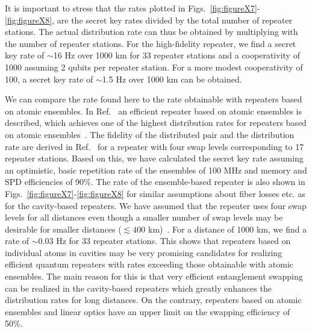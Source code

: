 It is important to stress that the rates plotted in
Figs.~\ref{fig:figureX7}-\ref{fig:figureX8}, are the secret key rates divided by
the total number of repeater stations. The actual distribution rate can thus be
obtained by multiplying with the number of repeater stations. For the
high-fidelity repeater, we find a secret key rate of $\sim$16 Hz over 1000 km
for 33 repeater stations and a cooperativity of 1000 assuming 2 qubits per
repeater station.  For a more modest cooperativity of 100, a secret key rate of
$\sim$1.5 Hz over 1000 km can be obtained.

We can compare the rate found here to the rate obtainable with repeaters based
on atomic ensembles. In Ref.~\cite{sangouard1} an efficient repeater based on
atomic ensembles is described, which achieves one of the highest distribution
rates for repeaters based on atomic ensembles~\cite{sangouard3}. The fidelity of
the distributed pair and the distribution rate are derived in
Ref.~\cite{sangouard1} for a repeater with four swap levels corresponding to 17
repeater stations.  Based on this, we have calculated the secret key rate
assuming an optimistic, basic repetition rate of the ensembles of 100 MHz and
memory and SPD efficiencies of 90\%. The rate of the ensemble-based repeater is
also shown in Figs.~\ref{fig:figureX7}-\ref{fig:figureX8} for similar
assumptions about fiber losses etc. as for the cavity-based repeaters. We have
assumed that the repeater uses four swap levels for all distances even though a
smaller number of swap levels may be desirable for smaller distances
($\lesssim400$ km)~\cite{sangouard1}. For a distance of 1000 km, we find a rate
of $\sim0.03$ Hz for 33 repeater stations. This shows that repeaters based on
individual atoms in cavities may be very promising candidates for realizing
efficient quantum repeaters with rates exceeding those obtainable with atomic
ensembles. The main reason for this is that very efficient entanglement swapping
can be realized in the cavity-based repeaters which greatly enhances the
distribution rates for long distances. On the contrary, repeaters based on
atomic ensembles and linear optics have an upper limit on the swapping
efficiency of 50\%.

